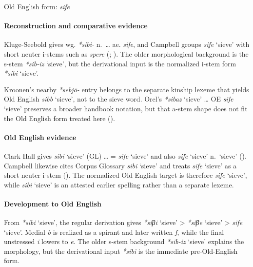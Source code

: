 \documentclass[
  british,
  a4paper,
]{article}
\providecommand{\Recon}[1]{\emph{*#1}}
\begin{document}
Old English form: \emph{sife}

\paragraph{Reconstruction and comparative
evidence}\label{reconstruction-and-comparative-evidence-103}

Kluge-Seebold gives wg. \emph{*sibi-} n.~\ldots{} ae. \emph{sife}, and
Campbell groups {\emph{sife}} `sieve' with short neuter i-stems such as
\emph{spere} (;
). The older
morphological background is the s-stem \Recon{sib-iz} `sieve', but the
derivational input is the normalized i-stem form \Recon{síbi} `sieve'.

Kroonen's nearby \emph{*sebjō-} entry belongs to the separate kinship
lexeme that yields Old English {\emph{sibb}} `sieve', not to the sieve
word. Orel's \Recon{sibaz} `sieve' \ldots{} OE {\emph{sife}} `sieve'
preserves a broader handbook notation, but that a-stem shape does not
fit the Old English form treated here ().

\paragraph{Old English evidence}\label{old-english-evidence-103}

Clark Hall gives {\emph{sibi}} `sieve' (GL) \ldots{} = {\emph{sife}}
`sieve' and also {\emph{sife}} `sieve' n.~`sieve'
(). Campbell likewise
cites Corpus Glossary \emph{sibi} `sieve' and treats \emph{sife} `sieve'
as a short neuter i-stem (). The normalized Old English target is therefore
\emph{sife} `sieve', while \emph{sibi} `sieve' is an attested earlier
spelling rather than a separate lexeme.

\paragraph{Development to Old
English}\label{development-to-old-english-103}

From \Recon{síbi} `sieve', the regular derivation gives \Recon{síβi}
`sieve' \textgreater{} \Recon{síβe} `sieve' \textgreater{} {\emph{sife}}
`sieve'. Medial \emph{b} is realized as a spirant and later written
\emph{f}, while the final unstressed \emph{i} lowers to \emph{e}. The
older s-stem background \Recon{sib-iz} `sieve' explains the morphology,
but the derivational input \Recon{síbi} is the immediate pre-Old-English
form.
\end{document}
